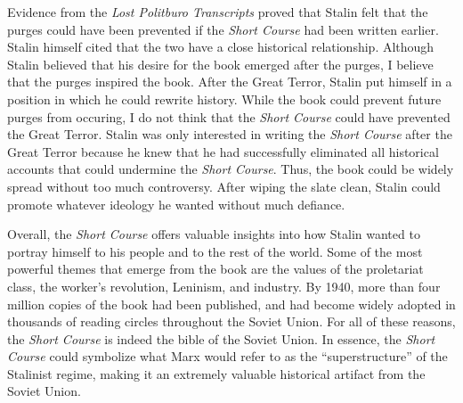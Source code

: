 \documentclass[a4paper, twocolumn]{article}
\begin{document}
Evidence from the \emph{Lost Politburo Transcripts} proved that Stalin felt
that the purges could have been prevented if the \emph{Short Course} had been
written earlier. Stalin himself cited that the two have a close
historical relationship. Although Stalin believed that his desire for the
book emerged after the purges, I believe that the purges inspired the
book. After the Great Terror, Stalin put himself in a position in
which he could rewrite history. While the book could prevent future purges
from occuring, I do not think that the \emph{Short
Course} could have prevented the Great Terror. Stalin was only
interested in writing the \emph{Short Course} after the Great Terror because
he knew that he had successfully eliminated all historical accounts
that could undermine the \emph{Short Course}. Thus, the book could be widely
spread without too much controversy. After wiping the slate clean,
Stalin could promote whatever ideology he wanted without much
defiance.

Overall, the \emph{Short Course} offers valuable insights into how Stalin
wanted to portray himself to his people and to the rest of the
world. Some of the most powerful themes that emerge from the book are
the values of the proletariat class, the worker's revolution,
Leninism, and industry. By 1940, more than four million copies of the
book had been published, and had become widely adopted in thousands of
reading circles throughout the Soviet Union. For all of these reasons,
the \emph{Short Course} is indeed the bible of the Soviet Union. In essence, the \emph{Short Course} could symbolize what
Marx would refer to as the ``superstructure'' of the Stalinist regime,
making it an extremely valuable historical artifact from the Soviet
Union.


\clearpage

\endgroup
\onecolumn
\renewcommand*{\thefootnote}{\fnsymbol{footnote}}
\end{document}
